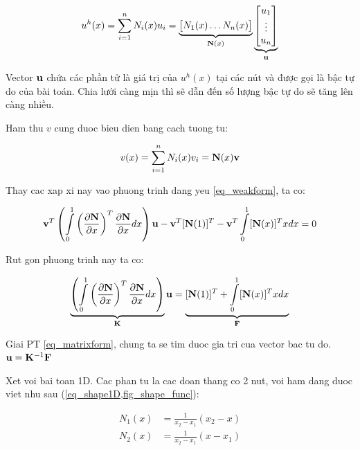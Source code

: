 \begin{equation}\label{eq_interpolation}
    u^h(x) = \sum\limits_{i=1}^n N_i(x) u_i = \underbrace{\begin{bmatrix}
        N_1(x) \dots N_n(x)
    \end{bmatrix}}_{{\bf N}(x)} \underbrace{\begin{bmatrix}
        u_1 \\ \vdots \\ u_n 
    \end{bmatrix}}_{\bf u}
\end{equation}

Vector ${\bf u}$ chứa các phần tử là giá trị của $u^h(x)$ tại các nút và được gọi là bậc tự do của bài toán. Chia lưới càng mịn thì sẽ dẫn đến số lượng bậc tự do sẽ tăng lên càng nhiều.

Ham thu $v$ cung duoc bieu dien bang cach tuong tu: 

\begin{equation}\label{eq_interpolation_test}
    v(x) = \sum\limits_{i=1}^n N_i(x) v_i = {{\bf N}(x)}{\bf v}
\end{equation}

Thay cac xap xi nay vao phuong trinh dang yeu \cref{eq_weakform}, ta co:

\begin{equation}
    {\bf v}^T\left(\int\limits_0^1\left(\frac{\partial{\bf N}}{\partial x}\right)^T\frac{\partial{\bf N}}{\partial x} dx\right){\bf u} - {\bf v}^T[{\bf N}(1)]^T - {\bf v}^T\int\limits_0^1 [{\bf N}(x)]^Tx dx = 0
\end{equation}

Rut gon phuong trinh nay ta co:

\begin{equation}\label{eq_matrixform}
    \underbrace{\left(\int\limits_0^1\left(\frac{\partial{\bf N}}{\partial x}\right)^T\frac{\partial{\bf N}}{\partial x} dx\right)}_{\bf K}{\bf u} = \underbrace{[{\bf N}(1)]^T + \int\limits_0^1 [{\bf N}(x)]^Tx dx}_{\bf F} 
\end{equation}

Giai PT \cref{eq_matrixform}, chung ta se tim duoc gia tri cua vector bac tu do. ${\bf u} = {\bf K}^{-1}{\bf F}$

Xet voi bai toan 1D. Cac phan tu la cac doan thang co 2 nut, voi ham dang duoc viet nhu sau (\cref{eq_shape1D,fig_shape_func}):

\begin{equation}\label{eq_shape1D}
    \begin{aligned}
        N_1(x) &= \frac{1}{x_2-x_1}\left(x_2-x\right) \\
        N_2(x) &= \frac{1}{x_2-x_1}\left(x-x_1\right) \\
    \end{aligned}
\end{equation}

